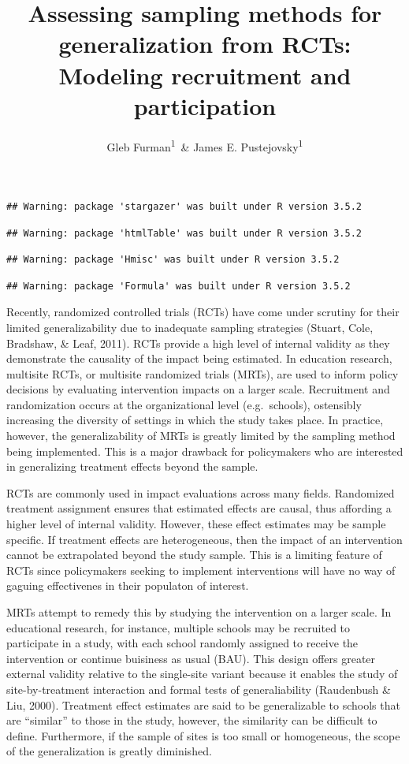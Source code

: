 \documentclass[man,floatsintext]{apa6}
\title{Assessing sampling methods for generalization from RCTs: Modeling
recruitment and participation}
\author{Gleb Furman\textsuperscript{1}~\& James E.
Pustejovsky\textsuperscript{1}}
\date{}
\affiliation{
\vspace{0.5cm}
\textsuperscript{1} University of Texas at Austin}
\theoremstyle{definition}
\theoremstyle{definition}
\theoremstyle{definition}
\theoremstyle{remark}
\begin{document}
\maketitle

\begin{verbatim}
## Warning: package 'stargazer' was built under R version 3.5.2
\end{verbatim}

\begin{verbatim}
## Warning: package 'htmlTable' was built under R version 3.5.2
\end{verbatim}

\begin{verbatim}
## Warning: package 'Hmisc' was built under R version 3.5.2
\end{verbatim}

\begin{verbatim}
## Warning: package 'Formula' was built under R version 3.5.2
\end{verbatim}

Recently, randomized controlled trials (RCTs) have come under scrutiny
for their limited generalizability due to inadequate sampling strategies
(Stuart, Cole, Bradshaw, \& Leaf, 2011). RCTs provide a high level of
internal validity as they demonstrate the causality of the impact being
estimated. In education research, multisite RCTs, or multisite
randomized trials (MRTs), are used to inform policy decisions by
evaluating intervention impacts on a larger scale. Recruitment and
randomization occurs at the organizational level (e.g.~schools),
ostensibly increasing the diversity of settings in which the study takes
place. In practice, however, the generalizability of MRTs is greatly
limited by the sampling method being implemented. This is a major
drawback for policymakers who are interested in generalizing treatment
effects beyond the sample.

RCTs are commonly used in impact evaluations across many fields.
Randomized treatment assignment ensures that estimated effects are
causal, thus affording a higher level of internal validity. However,
these effect estimates may be sample specific. If treatment effects are
heterogeneous, then the impact of an intervention cannot be extrapolated
beyond the study sample. This is a limiting feature of RCTs since
policymakers seeking to implement interventions will have no way of
gaguing effectivenes in their populaton of interest.

MRTs attempt to remedy this by studying the intervention on a larger
scale. In educational research, for instance, multiple schools may be
recruited to participate in a study, with each school randomly assigned
to receive the intervention or continue buisiness as usual (BAU). This
design offers greater external validity relative to the single-site
variant because it enables the study of site-by-treatment interaction
and formal tests of generaliability (Raudenbush \& Liu, 2000). Treatment
effect estimates are said to be generalizable to schools that are
\enquote{similar} to those in the study, however, the similarity can be
difficult to define. Furthermore, if the sample of sites is too small or
homogeneous, the scope of the generalization is greatly diminished.
\end{document}
